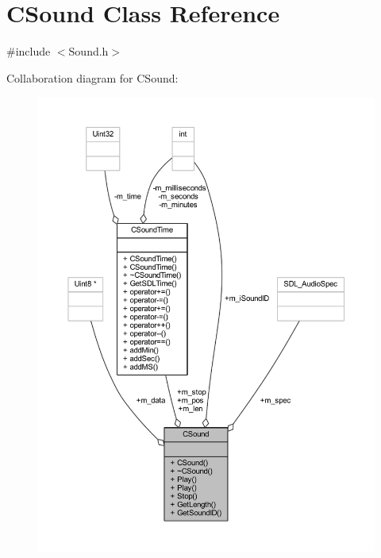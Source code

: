 \hypertarget{class_c_sound}{}\section{C\+Sound Class Reference}
\label{class_c_sound}


{\ttfamily \#include $<$Sound.\+h$>$}



Collaboration diagram for C\+Sound\+:
\nopagebreak
\begin{figure}[H]
\begin{center}
\leavevmode
\includegraphics[width=350pt]{class_c_sound__coll__graph}
\end{center}
\end{figure}
